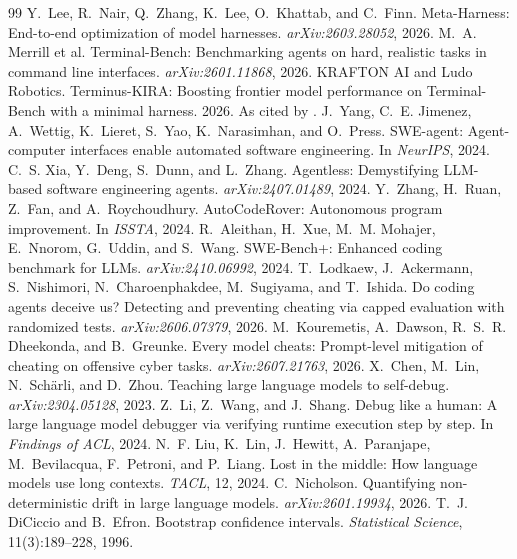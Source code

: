 \documentclass[10pt]{article}
\begin{document}
\small

\begin{thebibliography}{99}\itemsep1pt
 Y.~Lee, R.~Nair, Q.~Zhang, K.~Lee, O.~Khattab, and C.~Finn. Meta-Harness: End-to-end optimization of model harnesses. \emph{arXiv:2603.28052}, 2026.
 M.~A. Merrill et al. Terminal-Bench: Benchmarking agents on hard, realistic tasks in command line interfaces. \emph{arXiv:2601.11868}, 2026.
 KRAFTON AI and Ludo Robotics. Terminus-KIRA: Boosting frontier model performance on Terminal-Bench with a minimal harness. 2026. As cited by \citet{metaharness}.
 J.~Yang, C.~E. Jimenez, A.~Wettig, K.~Lieret, S.~Yao, K.~Narasimhan, and O.~Press. SWE-agent: Agent-computer interfaces enable automated software engineering. In \emph{NeurIPS}, 2024.
 C.~S. Xia, Y.~Deng, S.~Dunn, and L.~Zhang. Agentless: Demystifying LLM-based software engineering agents. \emph{arXiv:2407.01489}, 2024.
 Y.~Zhang, H.~Ruan, Z.~Fan, and A.~Roychoudhury. AutoCodeRover: Autonomous program improvement. In \emph{ISSTA}, 2024.
 R.~Aleithan, H.~Xue, M.~M. Mohajer, E.~Nnorom, G.~Uddin, and S.~Wang. SWE-Bench+: Enhanced coding benchmark for LLMs. \emph{arXiv:2410.06992}, 2024.
 T.~Lodkaew, J.~Ackermann, S.~Nishimori, N.~Charoenphakdee, M.~Sugiyama, and T.~Ishida. Do coding agents deceive us? Detecting and preventing cheating via capped evaluation with randomized tests. \emph{arXiv:2606.07379}, 2026.
 M.~Kouremetis, A.~Dawson, R.~S.~R. Dheekonda, and B.~Greunke. Every model cheats: Prompt-level mitigation of cheating on offensive cyber tasks. \emph{arXiv:2607.21763}, 2026.
 X.~Chen, M.~Lin, N.~Sch\"arli, and D.~Zhou. Teaching large language models to self-debug. \emph{arXiv:2304.05128}, 2023.
 Z.~Li, Z.~Wang, and J.~Shang. Debug like a human: A large language model debugger via verifying runtime execution step by step. In \emph{Findings of ACL}, 2024.
 N.~F. Liu, K.~Lin, J.~Hewitt, A.~Paranjape, M.~Bevilacqua, F.~Petroni, and P.~Liang. Lost in the middle: How language models use long contexts. \emph{TACL}, 12, 2024.
 C.~Nicholson. Quantifying non-deterministic drift in large language models. \emph{arXiv:2601.19934}, 2026.
 T.~J. DiCiccio and B.~Efron. Bootstrap confidence intervals. \emph{Statistical Science}, 11(3):189--228, 1996.
\end{thebibliography}
\end{document}
